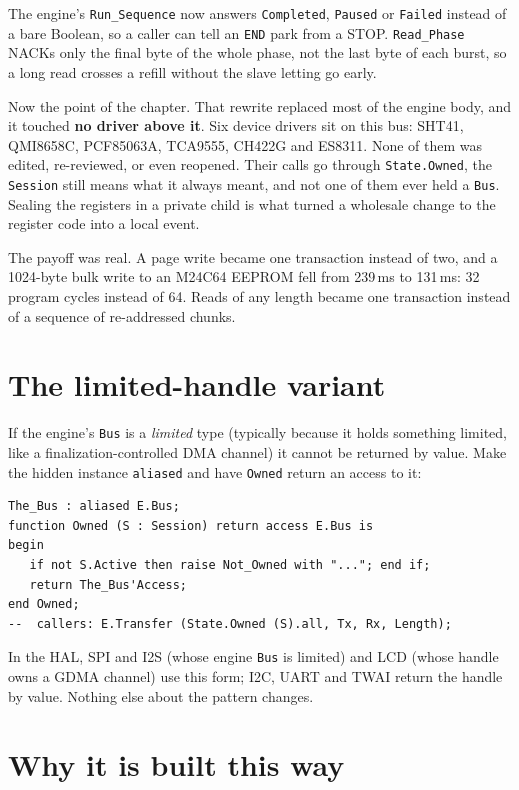 The engine's \texttt{Run\_Sequence} now answers \texttt{Completed}, \texttt{Paused}
or \texttt{Failed} instead of a bare Boolean, so a caller can tell an \texttt{END}
park from a STOP. \texttt{Read\_Phase} NACKs only the final byte of the whole
phase, not the last byte of each burst, so a long read crosses a refill without
the slave letting go early.

Now the point of the chapter. That rewrite replaced most of the engine body, and
it touched \textbf{no driver above it}. Six device drivers sit on this bus:
SHT41, QMI8658C, PCF85063A, TCA9555, CH422G and ES8311. None of them was edited,
re-reviewed, or even reopened. Their calls go through \texttt{State.Owned}, the
\texttt{Session} still means what it always meant, and not one of them ever held a
\texttt{Bus}. Sealing the registers in a private child is what turned a wholesale
change to the register code into a local event.

The payoff was real. A page write became one transaction instead of two, and a
1024-byte bulk write to an M24C64 EEPROM fell from 239\,ms to 131\,ms: 32 program
cycles instead of 64. Reads of any length became one transaction instead of a
sequence of re-addressed chunks.

\section{The limited-handle variant}

If the engine's \texttt{Bus} is a \emph{limited} type (typically because it
holds something limited, like a finalization-controlled DMA channel) it cannot
be returned by value. Make the hidden instance \texttt{aliased} and have
\texttt{Owned} return an access to it:

\begin{lstlisting}
The_Bus : aliased E.Bus;
function Owned (S : Session) return access E.Bus is
begin
   if not S.Active then raise Not_Owned with "..."; end if;
   return The_Bus'Access;
end Owned;
--  callers: E.Transfer (State.Owned (S).all, Tx, Rx, Length);
\end{lstlisting}

In the HAL, SPI and I2S (whose engine \texttt{Bus} is limited) and LCD (whose
handle owns a GDMA channel) use this form; I2C, UART and TWAI return the handle by
value. Nothing else about the pattern changes.

\section{Why it is built this way}

